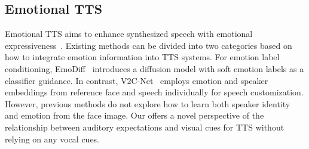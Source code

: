 \subsection{Emotional TTS}

Emotional TTS aims to enhance synthesized speech with emotional expressiveness~\cite{mmtts_emo:journals/corr/abs-2404-18398,emodiff:conf/icassp/GuoDCY23,visualvoicecloning/ChenTQZLW22}. Existing methods can be divided into two categories based on how to integrate emotion information into TTS systems. 
For emotion label conditioning, EmoDiff~\cite{emodiff:conf/icassp/GuoDCY23} introduces a diffusion model with soft emotion labels as a classifier guidance. 
In contrast, V2C-Net~\cite{visualvoicecloning/ChenTQZLW22} employs emotion and speaker embeddings from reference face and speech individually for speech customization. 
However, previous methods do not explore how to learn both speaker identity and emotion from the face image. Our \methodname offers a novel perspective of the relationship between auditory expectations and visual cues for TTS without relying on any vocal cues. 
